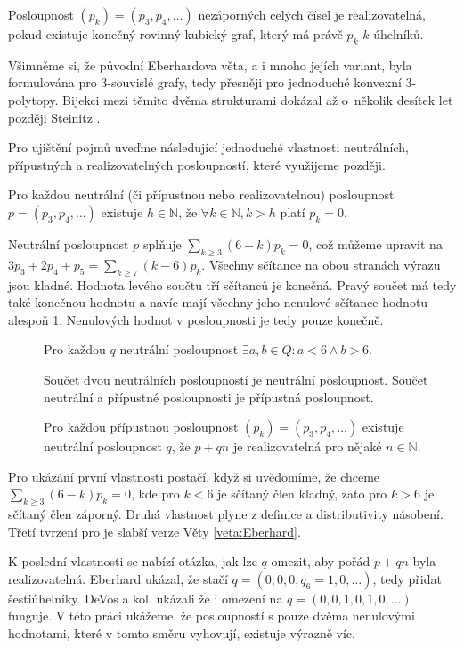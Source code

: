 \begin{definice}\label{def01:realizovatelna}
Posloupnost $(p_k) = (p_3,p_4,\dots)$ nezáporných celých čísel je realizovatelná, pokud existuje konečný rovinný kubický graf, který má právě $p_k$ $k$-úhelníků.
\end{definice}

Všimněme si, že původní Eberhardova věta, a i mnoho jejích variant, byla formulována pro 3-souvislé grafy, tedy přesněji pro jednoduché konvexní 3-polytopy. Bijekci mezi těmito dvěma strukturami dokázal až o~několik desítek let později Steinitz \cite{Steinitz}. 

Pro ujištění pojmů uveďme následující jednoduché vlastnosti neutrálních, přípustných a realizovatelných posloupností, které využijeme později.
\begin{tvrz}
Pro každou neutrální (či přípustnou nebo realizovatelnou) posloupnost $p=(p_3,p_4,\dots)$ existuje $h \in \mathbb{N}$, že $ \forall k \in \mathbb{N}, k>h $ platí $ p_k=0$.
\end{tvrz}

\begin{dukaz}
Neutrální posloupnost $p$ splňuje $\sum_{k \geq 3}{(6-k)p_k}=0$, což můžeme upravit na $3p_3+2p_4+p_5=\sum_{k \geq 7}{(k-6)p_k}$. Všechny sčítance na obou stranách výrazu jsou kladné. Hodnota levého součtu tří sčítanců je konečná. Pravý součet má tedy také konečnou hodnotu a navíc mají všechny jeho nenulové sčítance hodnotu alespoň 1. Nenulových hodnot v posloupnosti je tedy pouze konečně. 
\end{dukaz}

\begin{tvrz}\label{veta:posloupnosti}
\begin{description}
\item[] Pro každou $q$ neutrální posloupnost $\exists a,b \in Q : a <6 \wedge b>6$.
\item[] Součet dvou neutrálních posloupností je neutrální posloupnost. Součet neutrální a přípustné posloupnosti je přípustná posloupnost.
\item[] Pro každou přípustnou posloupnost $(p_k) = (p_3,p_4,\dots)$ existuje neutrální posloupnost $q$, že $p+qn$ je realizovatelná pro nějaké $n \in \mathbb{N}$.
\end{description}
\end{tvrz}

\begin{dukaz}
Pro ukázání první vlastnosti postačí, když si uvědomíme, že chceme $\sum_{k \geq 3}{(6-k)p_k} = 0$, kde pro $k < 6$ je sčítaný člen kladný, zato pro $k>6$ je sčítaný člen záporný. Druhá vlastnost plyne z definice a distributivity násobení. Třetí tvrzení pro je slabší verze Věty \ref{veta:Eberhard}.
\end{dukaz}
K poslední vlastnosti se nabízí otázka, jak lze $q$ omezit, aby pořád $p+qn$ byla realizovatelná. Eberhard ukázal, že stačí  $q = (0,0,0,q_6=1,0,\dots)$, tedy přidat šestiúhelníky. DeVos a kol. ukázali že i omezení na  $q = (0,0,1,0,1,0,\dots)$ funguje. V této práci ukážeme, že posloupností s pouze dvěma nenulovými hodnotami, které v tomto směru vyhovují, existuje výrazně víc.




